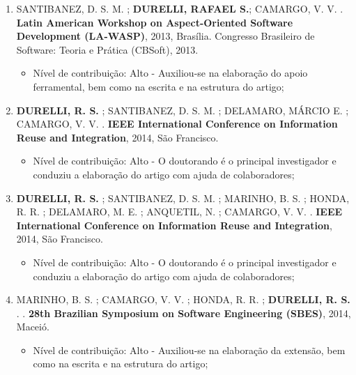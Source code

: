 \begin{itemize}
\begin{enumerate}
		\item SANTIBANEZ, D. S. M. ; \textbf{DURELLI, RAFAEL S.}; CAMARGO, V. V. . \textbf{Latin American Workshop on Aspect-Oriented Software Development (LA-WASP)}, 2013, Brasília. Congresso Brasileiro de Software: Teoria e Prática (CBSoft), 2013.
		
		    \begin{itemize}
			        \item Nível de contribuição: Alto - Auxiliou-se na elaboração do apoio ferramental, bem como na escrita e na estrutura do artigo;
			    \end{itemize}
		
		\item \textbf{DURELLI, R. S.} ; SANTIBANEZ, D. S. M. ; DELAMARO, MÁRCIO E. ; CAMARGO, V. V. . \textbf{IEEE International Conference on Information Reuse and Integration}, 2014, São Francisco.
		
		    \begin{itemize}
			        \item Nível de contribuição: Alto - O doutorando é o principal investigador e conduziu a elaboração do artigo com ajuda de colaboradores;
			    \end{itemize}
		
		\item \textbf{DURELLI, R. S.} ; SANTIBANEZ, D. S. M. ; MARINHO, B. S. ; HONDA, R. R. ; DELAMARO, M. E. ; ANQUETIL, N. ; CAMARGO, V. V. . \textbf{IEEE International Conference on Information Reuse and Integration}, 2014, São Francisco.
		    \begin{itemize}
			        \item Nível de contribuição: Alto - O doutorando é o principal investigador e conduziu a elaboração do artigo com ajuda de colaboradores;
			    \end{itemize}
		
		\item MARINHO, B. S. ; CAMARGO, V. V. ; HONDA, R. R. ; \textbf{DURELLI, R. S.} . . \textbf{28th Brazilian Symposium on Software Engineering (SBES)}, 2014, Maceió.
		
		    \begin{itemize}
			        \item Nível de contribuição: Alto - Auxiliou-se na elaboração da extensão, bem como na escrita e na estrutura do artigo;
			    \end{itemize}
		

\end{enumerate}
\end{itemize}
